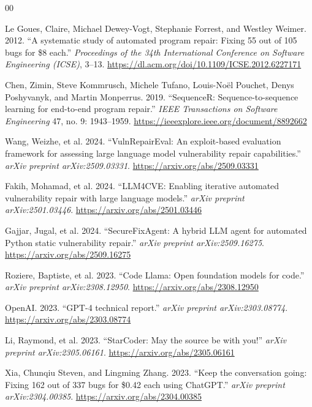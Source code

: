 \documentclass[conference]{IEEEtran}
\begin{document}
\begin{thebibliography}{00}

Le Goues, Claire, Michael Dewey-Vogt, Stephanie Forrest, and Westley Weimer. 2012. ``A systematic study of automated program repair: Fixing 55 out of 105 bugs for \$8 each.'' \textit{Proceedings of the 34th International Conference on Software Engineering (ICSE)}, 3--13. \url{https://dl.acm.org/doi/10.1109/ICSE.2012.6227171}

Chen, Zimin, Steve Kommrusch, Michele Tufano, Louis-Noël Pouchet, Denys Poshyvanyk, and Martin Monperrus. 2019. ``SequenceR: Sequence-to-sequence learning for end-to-end program repair.'' \textit{IEEE Transactions on Software Engineering} 47, no. 9: 1943--1959. \url{https://ieeexplore.ieee.org/document/8892662}

Wang, Weizhe, et al. 2024. ``VulnRepairEval: An exploit-based evaluation framework for assessing large language model vulnerability repair capabilities.'' \textit{arXiv preprint arXiv:2509.03331}. \url{https://arxiv.org/abs/2509.03331}

Fakih, Mohamad, et al. 2024. ``LLM4CVE: Enabling iterative automated vulnerability repair with large language models.'' \textit{arXiv preprint arXiv:2501.03446}. \url{https://arxiv.org/abs/2501.03446}

Gajjar, Jugal, et al. 2024. ``SecureFixAgent: A hybrid LLM agent for automated Python static vulnerability repair.'' \textit{arXiv preprint arXiv:2509.16275}. \url{https://arxiv.org/abs/2509.16275}

Roziere, Baptiste, et al. 2023. ``Code Llama: Open foundation models for code.'' \textit{arXiv preprint arXiv:2308.12950}. \url{https://arxiv.org/abs/2308.12950}

OpenAI. 2023. ``GPT-4 technical report.'' \textit{arXiv preprint arXiv:2303.08774}. \url{https://arxiv.org/abs/2303.08774}

Li, Raymond, et al. 2023. ``StarCoder: May the source be with you!'' \textit{arXiv preprint arXiv:2305.06161}. \url{https://arxiv.org/abs/2305.06161}

Xia, Chunqiu Steven, and Lingming Zhang. 2023. ``Keep the conversation going: Fixing 162 out of 337 bugs for \$0.42 each using ChatGPT.'' \textit{arXiv preprint arXiv:2304.00385}. \url{https://arxiv.org/abs/2304.00385}


\end{thebibliography}
\end{document}
